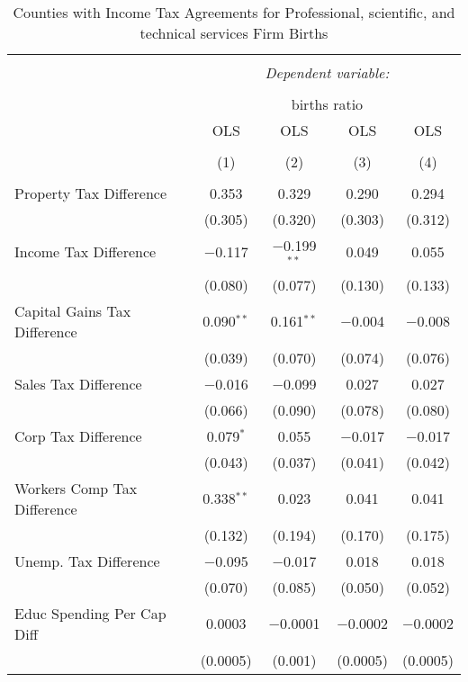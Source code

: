 
\begin{table}[!htbp] \centering 
  \caption{Counties with Income Tax Agreements for  Professional, scientific, and technical services Firm Births} 
  \label{54rd} 
\begin{tabular}{@{\extracolsep{5pt}}lcccc} 
\\[-1.8ex]\hline 
\hline \\[-1.8ex] 
 & \multicolumn{4}{c}{\textit{Dependent variable:}} \\ 
\cline{2-5} 
\\[-1.8ex] & \multicolumn{4}{c}{births ratio} \\ 
 & OLS & OLS & OLS & OLS \\ 
\\[-1.8ex] & (1) & (2) & (3) & (4)\\ 
\hline \\[-1.8ex] 
 Property Tax Difference & 0.353 & 0.329 & 0.290 & 0.294 \\ 
  & (0.305) & (0.320) & (0.303) & (0.312) \\ 
  Income Tax Difference & $-$0.117 & $-$0.199$^{**}$ & 0.049 & 0.055 \\ 
  & (0.080) & (0.077) & (0.130) & (0.133) \\ 
  Capital Gains Tax Difference & 0.090$^{**}$ & 0.161$^{**}$ & $-$0.004 & $-$0.008 \\ 
  & (0.039) & (0.070) & (0.074) & (0.076) \\ 
  Sales Tax Difference & $-$0.016 & $-$0.099 & 0.027 & 0.027 \\ 
  & (0.066) & (0.090) & (0.078) & (0.080) \\ 
  Corp Tax Difference & 0.079$^{*}$ & 0.055 & $-$0.017 & $-$0.017 \\ 
  & (0.043) & (0.037) & (0.041) & (0.042) \\ 
  Workers Comp Tax Difference & 0.338$^{**}$ & 0.023 & 0.041 & 0.041 \\ 
  & (0.132) & (0.194) & (0.170) & (0.175) \\ 
  Unemp. Tax Difference & $-$0.095 & $-$0.017 & 0.018 & 0.018 \\ 
  & (0.070) & (0.085) & (0.050) & (0.052) \\ 
  Educ Spending Per Cap Diff & 0.0003 & $-$0.0001 & $-$0.0002 & $-$0.0002 \\ 
  & (0.0005) & (0.001) & (0.0005) & (0.0005) \\ 

\end{tabular}
\end{table}
